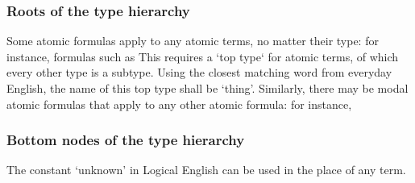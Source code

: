 \documentclass[../main.tex]{subfiles}
\begin{document}
\subsubsection{Roots of the type hierarchy}
Some atomic formulas apply to any atomic terms, no matter their type: for instance, formulas such as  This requires a `top type` for atomic terms, of which every other type is a subtype. Using the closest matching word from everyday English, the name of this top type shall be `thing'. Similarly, there may be modal atomic formulas that apply to any other atomic formula: for instance, 

\subsubsection{Bottom nodes of the type hierarchy}
The constant `unknown' in Logical English can be used in the place of any term.
\end{document}
